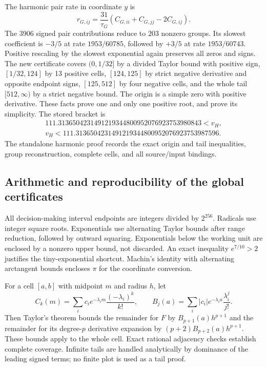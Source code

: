 \documentclass[11pt]{article}
\begin{document}
The harmonic pair rate in coordinate $y$ is
\[
 r_{G,ij}=\frac{31}{\tau_G}
       (C_{G,ii}+C_{G,jj}-2C_{G,ij}).
\]
The 3906 signed pair contributions reduce to 203 nonzero groups. Its
slowest coefficient is $-3/5$ at rate $1953/60785$, followed by $+3/5$
at rate $1953/60743$. Positive rescaling by the slowest exponential again
preserves all zeros and signs. The new certificate covers
$(0,1/32]$ by a divided Taylor bound with positive sign,
$[1/32,124]$ by 13 positive cells, $[124,125]$ by strict negative derivative
and opposite endpoint signs, $[125,512]$ by four negative cells, and the
whole tail $[512,\infty)$ by a strict negative bound. The origin is a
simple zero with positive derivative. These facts prove one and only one
positive root, and prove its simplicity. The stored bracket is
\[
 \begin{gathered}
 111.3136504231491219344800952076923753980843
 <v_H,\\
 v_H<111.3136504231491219344800952076923753987596.
 \end{gathered}
\]
The standalone harmonic proof records the exact origin and tail inequalities,
group reconstruction, complete cells, and all source/input bindings.

\subsection{Arithmetic and reproducibility of the global certificates}

All decision-making interval endpoints are integers divided by $2^{256}$.
Radicals use integer square roots. Exponentials use alternating Taylor
bounds after range reduction, followed by outward squaring. Exponentials
below the working unit are enclosed by a nonzero upper bound, not discarded.
An exact inequality $e^{7/10}>2$ justifies the tiny-exponential shortcut.
Machin's identity with alternating arctangent bounds encloses $\pi$ for
the coordinate conversion.

For a cell $[a,b]$ with midpoint $m$ and radius $h$, let
\[
 C_k(m)=\sum_i c_i e^{-\lambda_i m}\frac{(-\lambda_i)^k}{k!},\qquad
 B_j(a)=\sum_i |c_i|e^{-\lambda_i a}\frac{\lambda_i^j}{j!}.
\]
Then Taylor's theorem bounds the remainder for $F$ by
$B_{p+1}(a)h^{p+1}$ and the remainder for its degree-$p$ derivative expansion
by $(p+2)B_{p+2}(a)h^{p+1}$. These bounds apply to the whole cell.
Exact rational adjacency checks establish complete coverage. Infinite
tails are handled analytically by dominance of the leading signed terms;
no finite plot is used as a tail proof.
\end{document}
